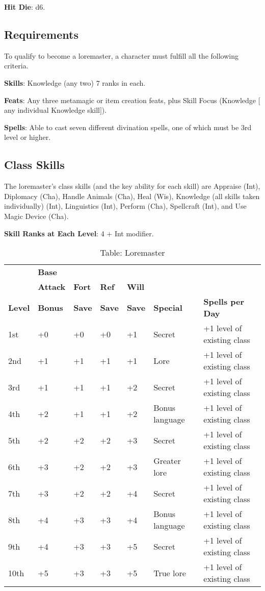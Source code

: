 \textbf{Hit Die}: d6.
				
\subsection{Requirements}

				
To qualify to become a loremaster, a character must fulfill all the following criteria.
				
\textbf{Skills}: Knowledge (any two) 7 ranks in each.
				
\textbf{Feats}: Any three metamagic or item creation feats, plus Skill Focus (Knowledge \mbox{$[$}any individual Knowledge skill\mbox{$]$}).
				
\textbf{Spells}: Able to cast seven different divination spells, one of which must be 3rd level or higher.
				
\subsection{Class Skills}

				
The loremaster's class skills (and the key ability for each skill) are Appraise (Int), Diplomacy (Cha), Handle Animals (Cha), Heal (Wis), Knowledge (all skills taken individually) (Int), Linguistics (Int), Perform (Cha), Spellcraft (Int), and Use Magic Device (Cha). 
				
\textbf{Skill Ranks at Each Level}: 4 + Int modifier.


\begin{table*}[]
\sffamily
\caption{Table: Loremaster}
\begin{tabular}{lllllll}
      & \textbf{Base} & & & & & \\ 
      & \textbf{Attack} & \textbf{Fort} & \textbf{Ref} & \textbf{Will} & & \\
\textbf{Level} & \textbf{Bonus }& \textbf{Save }&\textbf{ Save }& \textbf{Save }& \textbf{Special }& \textbf{Spells per Day}\\
1st & +0 & +0 & +0 & +1 & Secret & +1 level of existing class\\
2nd & +1 & +1 & +1 & +1 & Lore & +1 level of existing class\\
3rd & +1 & +1 & +1 & +2 & Secret & +1 level of existing class\\
4th & +2 & +1 & +1 & +2 & Bonus language & +1 level of existing class\\
5th & +2 & +2 & +2 & +3 & Secret & +1 level of existing class\\
6th & +3 & +2 & +2 & +3 & Greater lore & +1 level of existing class\\
7th & +3 & +2 & +2 & +4 & Secret & +1 level of existing class\\
8th & +4 & +3 & +3 & +4 & Bonus language & +1 level of existing class\\
9th & +4 & +3 & +3 & +5 & Secret & +1 level of existing class\\
10th & +5 & +3 & +3 & +5 & True lore & +1 level of existing class\\
\end{tabular}
\end{table*}
				
